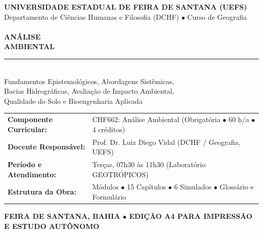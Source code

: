 \begin{titlepage}
\vspace*{1.0cm}
\begin{flushleft}
  {\color{uefsGold}\bfseries\small\sffamily UNIVERSIDADE ESTADUAL DE FEIRA DE SANTANA (UEFS)}\\[0.18cm]
  {\color{bgGold!90!white}\small\sffamily Departamento de Ciências Humanas e Filosofia (DCHF) $\bullet$ Curso de Geografia}\\[1.15cm]

  \\[0.65cm]

  {\color{white}\bfseries\fontsize{38}{43}\selectfont\sffamily ANÁLISE}\\[0.15cm]
  {\color{white}\bfseries\fontsize{38}{43}\selectfont\sffamily AMBIENTAL}\\[0.5cm]

  {\color{uefsGold}\rule{4.8cm}{2.2pt}}\\[0.5cm]

  {\color{bgGold}\large\sffamily Fundamentos Epistemológicos, Abordagens Sistêmicas,\\
  Bacias Hidrográficas, Avaliação de Impacto Ambiental,\\
  Qualidade do Solo e Bioengenharia Aplicada}
\end{flushleft}

\vspace*{5.5cm}

\begin{center}
  \begin{tcolorbox}[colback=white, colframe=uefsNavy, borderline west={3.5pt}{0pt}{uefsTeal}, arc=3pt, boxrule=0.8pt, width=0.98\textwidth, left=14pt, right=14pt, top=11pt, bottom=11pt]
    \renewcommand{\arraystretch}{1.28}
    \small
    \begin{tabularx}{\textwidth}{@{}p{4.1cm} >{\raggedright\arraybackslash}X@{}}
      \textbf{\color{uefsNavy}Componente Curricular:} & CHF662: Análise Ambiental (Obrigatória $\bullet$ 60 h/a $\bullet$ 4 créditos) \\
      \textbf{\color{uefsNavy}Docente Responsável:} & Prof. Dr. Luiz Diego Vidal (DCHF / Geografia, UEFS) \\
      \textbf{\color{uefsNavy}Período e Atendimento:} & Terças, 07h30 às 11h30 (Laboratório GEOTRÓPICOS) \\
      \textbf{\color{uefsNavy}Estrutura da Obra:} & 5 Módulos $\bullet$ 15 Capítulos $\bullet$ 6 Simulados $\bullet$ Glossário e Formulário \\
    \end{tabularx}
  \end{tcolorbox}
\end{center}

\vfill
\begin{center}
  {\footnotesize\color{uefsMuted}\bfseries FEIRA DE SANTANA, BAHIA $\bullet$ EDIÇÃO A4 PARA IMPRESSÃO E ESTUDO AUTÔNOMO}
\end{center}
\end{titlepage}

